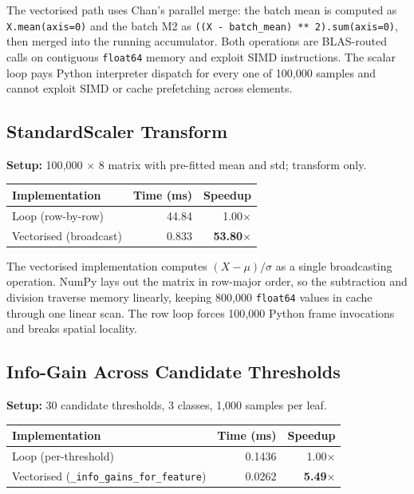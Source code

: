 \documentclass[10pt,a4paper]{article}
\begin{document}
The vectorised path uses Chan's parallel merge: the batch mean is computed as \texttt{X.mean(axis=0)} and the batch M2 as \texttt{((X - batch\_mean) ** 2).sum(axis=0)}, then merged into the running accumulator. Both operations are BLAS-routed calls on contiguous \texttt{float64} memory and exploit SIMD instructions. The scalar loop pays Python interpreter dispatch for every one of 100{,}000 samples and cannot exploit SIMD or cache prefetching across elements.

\subsection{StandardScaler Transform}

\textbf{Setup:} 100{,}000 $\times$ 8 matrix with pre-fitted mean and std; transform only.

\begin{table}[h]
\centering
\footnotesize
\begin{tabular}{lrr}
\toprule
Implementation & Time (ms) & Speedup \\
\midrule
Loop (row-by-row) & 44.84 & 1.00$\times$ \\
Vectorised (broadcast) & 0.833 & \textbf{53.80$\times$} \\
\bottomrule
\end{tabular}
\end{table}

The vectorised implementation computes $(X - \mu) / \sigma$ as a single broadcasting operation. NumPy lays out the matrix in row-major order, so the subtraction and division traverse memory linearly, keeping 800{,}000 \texttt{float64} values in cache through one linear scan. The row loop forces 100{,}000 Python frame invocations and breaks spatial locality.

\subsection{Info-Gain Across Candidate Thresholds}

\textbf{Setup:} 30 candidate thresholds, 3 classes, 1{,}000 samples per leaf.

\begin{table}[h]
\centering
\footnotesize
\begin{tabular}{lrr}
\toprule
Implementation & Time (ms) & Speedup \\
\midrule
Loop (per-threshold) & 0.1436 & 1.00$\times$ \\
Vectorised (\texttt{\_info\_gains\_for\_feature}) & 0.0262 & \textbf{5.49$\times$} \\
\bottomrule
\end{tabular}
\end{table}
\end{document}
